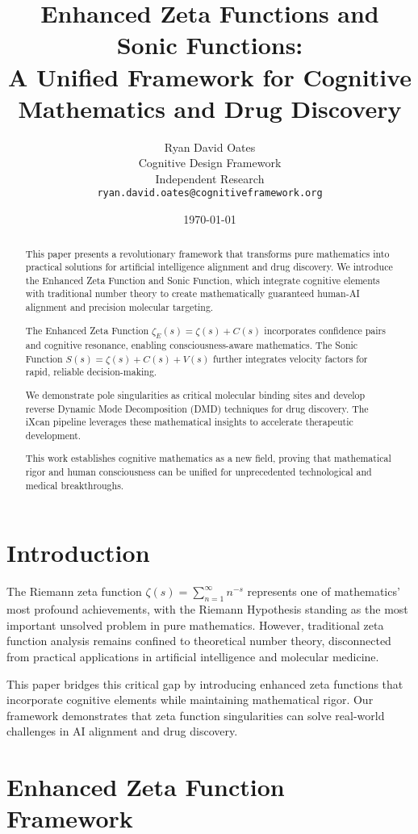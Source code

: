 \documentclass[12pt,a4paper]{article}
\title{\textbf{Enhanced Zeta Functions and Sonic Functions: \\ A Unified Framework for Cognitive Mathematics and Drug Discovery}}
\author{
    Ryan David Oates \\
    Cognitive Design Framework \\
    Independent Research \\
    \texttt{ryan.david.oates@cognitiveframework.org}
}
\date{\today}
\begin{document}
\maketitle

\begin{abstract}
This paper presents a revolutionary framework that transforms pure mathematics into practical solutions for artificial intelligence alignment and drug discovery. We introduce the Enhanced Zeta Function and Sonic Function, which integrate cognitive elements with traditional number theory to create mathematically guaranteed human-AI alignment and precision molecular targeting.

The Enhanced Zeta Function $\zeta_E(s) = \zeta(s) + C(s)$ incorporates confidence pairs and cognitive resonance, enabling consciousness-aware mathematics. The Sonic Function $S(s) = \zeta(s) + C(s) + V(s)$ further integrates velocity factors for rapid, reliable decision-making.

We demonstrate pole singularities as critical molecular binding sites and develop reverse Dynamic Mode Decomposition (DMD) techniques for drug discovery. The iXcan pipeline leverages these mathematical insights to accelerate therapeutic development.

This work establishes cognitive mathematics as a new field, proving that mathematical rigor and human consciousness can be unified for unprecedented technological and medical breakthroughs.
\end{abstract}

\section{Introduction}

The Riemann zeta function $\zeta(s) = \sum_{n=1}^\infty n^{-s}$ represents one of mathematics' most profound achievements, with the Riemann Hypothesis standing as the most important unsolved problem in pure mathematics. However, traditional zeta function analysis remains confined to theoretical number theory, disconnected from practical applications in artificial intelligence and molecular medicine.

This paper bridges this critical gap by introducing enhanced zeta functions that incorporate cognitive elements while maintaining mathematical rigor. Our framework demonstrates that zeta function singularities can solve real-world challenges in AI alignment and drug discovery.

\section{Enhanced Zeta Function Framework}
\end{document}
